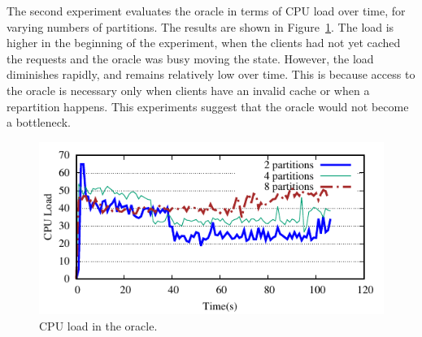 The second experiment evaluates the oracle in terms of CPU load over
time, for varying numbers of partitions. The results are shown in
Figure~\ref{fig:cpu_oracle}. The load is higher in the
beginning of the experiment, when the clients had not yet cached the
requests and the oracle was busy moving the state. However, the load diminishes rapidly, and remains relatively
low over time. This is because access to the oracle is necessary only
when clients have an invalid cache or when a repartition happens. This experiments
suggest that the oracle would not become a bottleneck.%

\begin{figure}[ht]
	\includegraphics[width=\columnwidth]{figures/socc/socc-oracle-load}
	\caption{CPU load in the oracle.}
	\label{fig:cpu_oracle}
\end{figure}

